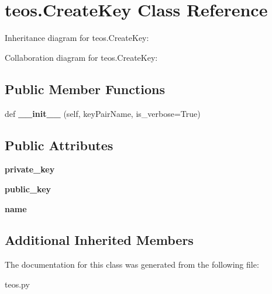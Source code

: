 \hypertarget{classteos_1_1CreateKey}{}\section{teos.\+Create\+Key Class Reference}
\label{classteos_1_1CreateKey}


Inheritance diagram for teos.\+Create\+Key\+:


Collaboration diagram for teos.\+Create\+Key\+:
\subsection*{Public Member Functions}
\begin{DoxyCompactItemize}
\item 
\mbox{\label{classteos_1_1CreateKey_a1a0421ac4fc678ebce61fc27b10f9a69}} 
def {\bfseries \+\_\+\+\_\+init\+\_\+\+\_\+} (self, key\+Pair\+Name, is\+\_\+verbose=True)
\end{DoxyCompactItemize}
\subsection*{Public Attributes}
\begin{DoxyCompactItemize}
\item 
\mbox{\label{classteos_1_1CreateKey_a989d01b8274c83448c3ed51b6f0a511f}} 
{\bfseries private\+\_\+key}
\item 
\mbox{\label{classteos_1_1CreateKey_aa565c3c1262f0fc91603a1be9a7302fb}} 
{\bfseries public\+\_\+key}
\item 
\mbox{\label{classteos_1_1CreateKey_a6196a5517031fb945b1b2a75d96fe356}} 
{\bfseries name}
\end{DoxyCompactItemize}
\subsection*{Additional Inherited Members}


The documentation for this class was generated from the following file\+:\begin{DoxyCompactItemize}
\item 
teos.\+py\end{DoxyCompactItemize}
